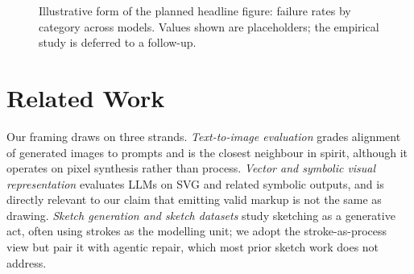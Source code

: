 \documentclass[10pt,twocolumn]{article}
\begin{document}
\begin{figure}[t]
  \centering
  \caption{Illustrative form of the planned headline figure: failure
    rates by category across models. Values shown are placeholders;
    the empirical study is deferred to a follow-up.}
  \label{fig:bar-placeholder}
\end{figure}

\section{Related Work}

Our framing draws on three strands. \emph{Text-to-image evaluation}
\cite{drawbench,geneval} grades alignment of generated images to
prompts and is the closest neighbour in spirit, although it operates
on pixel synthesis rather than process. \emph{Vector and symbolic
visual representation} \cite{svgenius,vcode} evaluates LLMs on SVG
and related symbolic outputs, and is directly relevant to our claim
that emitting valid markup is not the same as drawing. \emph{Sketch
generation and sketch datasets} \cite{clipdraw,sketchrnn,sketchy}
study sketching as a generative act, often using strokes as the
modelling unit; we adopt the stroke-as-process view but pair it with
agentic repair, which most prior sketch work does not address.
\end{document}
